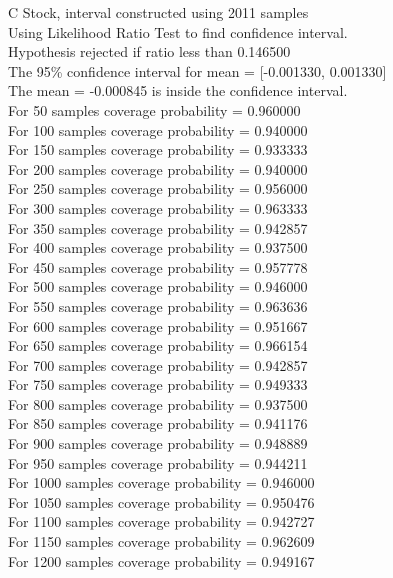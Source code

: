 \documentclass{article}
\begin{document}
C Stock, interval constructed using 2011 samples\\
Using Likelihood Ratio Test to find confidence interval.\\
Hypothesis rejected if ratio less than 0.146500\\
The 95\% confidence interval for mean = [-0.001330, 0.001330]\\
The mean = -0.000845 is inside the confidence interval.\\
For 50 samples coverage probability = 0.960000\\
For 100 samples coverage probability = 0.940000\\
For 150 samples coverage probability = 0.933333\\
For 200 samples coverage probability = 0.940000\\
For 250 samples coverage probability = 0.956000\\
For 300 samples coverage probability = 0.963333\\
For 350 samples coverage probability = 0.942857\\
For 400 samples coverage probability = 0.937500\\
For 450 samples coverage probability = 0.957778\\
For 500 samples coverage probability = 0.946000\\
For 550 samples coverage probability = 0.963636\\
For 600 samples coverage probability = 0.951667\\
For 650 samples coverage probability = 0.966154\\
For 700 samples coverage probability = 0.942857\\
For 750 samples coverage probability = 0.949333\\
For 800 samples coverage probability = 0.937500\\
For 850 samples coverage probability = 0.941176\\
For 900 samples coverage probability = 0.948889\\
For 950 samples coverage probability = 0.944211\\
For 1000 samples coverage probability = 0.946000\\
For 1050 samples coverage probability = 0.950476\\
For 1100 samples coverage probability = 0.942727\\
For 1150 samples coverage probability = 0.962609\\
For 1200 samples coverage probability = 0.949167\\
\end{document}
